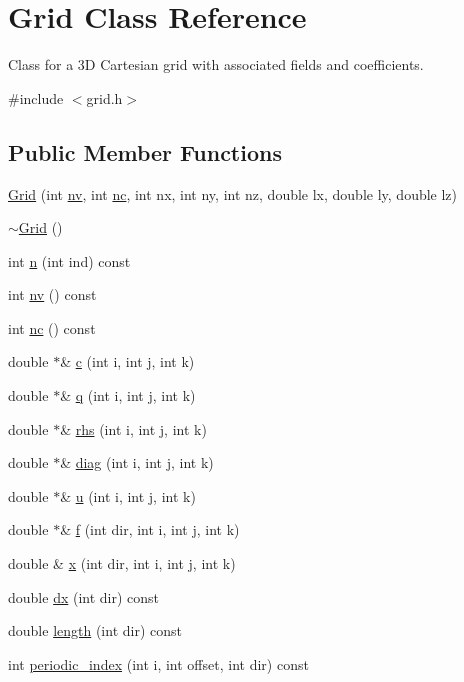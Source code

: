 \hypertarget{class_grid}{}\section{Grid Class Reference}
\label{class_grid}


Class for a 3D Cartesian grid with associated fields and coefficients.  




{\ttfamily \#include $<$grid.\+h$>$}

\subsection*{Public Member Functions}
\begin{DoxyCompactItemize}
\item 
\hyperlink{class_grid_aebc7528645c82055a45734458768be3c}{Grid} (int \hyperlink{class_grid_aee3a9d9ee92ea0ae23cb9b6e4da87e71}{nv}, int \hyperlink{class_grid_a7c02ca12ca63111a78236bf0b3ea88d8}{nc}, int nx, int ny, int nz, double lx, double ly, double lz)
\item 
\hyperlink{class_grid_a3661d0a7f998caaaf8627d7a67072116}{$\sim$\+Grid} ()
\item 
int \hyperlink{class_grid_a2fa46effcf9fbe97342b52850b72ac4c}{n} (int ind) const 
\item 
int \hyperlink{class_grid_aee3a9d9ee92ea0ae23cb9b6e4da87e71}{nv} () const 
\item 
int \hyperlink{class_grid_a7c02ca12ca63111a78236bf0b3ea88d8}{nc} () const 
\item 
double $\ast$\& \hyperlink{class_grid_a0f9d59290314e420e7adecfd6e55769c}{c} (int i, int j, int k)
\item 
double $\ast$\& \hyperlink{class_grid_ae0242e4a6d23d49e6f0382024c8f09f3}{q} (int i, int j, int k)
\item 
double $\ast$\& \hyperlink{class_grid_a68bb38f78d5f58d3dd04aa8346e8af80}{rhs} (int i, int j, int k)
\item 
double $\ast$\& \hyperlink{class_grid_af0e0caeaf47e389ea9ec154c84143ee2}{diag} (int i, int j, int k)
\item 
double $\ast$\& \hyperlink{class_grid_a8f28cebc79e45a246b2292573c988fb2}{u} (int i, int j, int k)
\item 
double $\ast$\& \hyperlink{class_grid_a91e327bd3db5b3bc85b20ad1173440d1}{f} (int dir, int i, int j, int k)
\item 
double \& \hyperlink{class_grid_ae74093daa7e9bafe77591f9336eaa409}{x} (int dir, int i, int j, int k)
\item 
double \hyperlink{class_grid_a25a0af18201fb7b20335fe745f931b1e}{dx} (int dir) const 
\item 
double \hyperlink{class_grid_ac29ca7c86c12fd0e6f1e9e5cf14c56c5}{length} (int dir) const 
\item 
int \hyperlink{class_grid_a42714a91c55d99a126b06243ecb2a673}{periodic\+\_\+index} (int i, int offset, int dir) const 
\end{DoxyCompactItemize}
